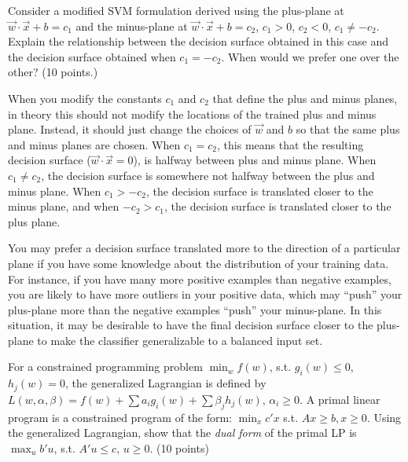 \documentclass[fleqn]{homework}
\begin{document}
  \maketitle

  \begin{problem}{1}
    \begin{question}
      Consider a modified SVM formulation derived using the plus-plane at
      $\vec{w}\cdot\vec{x} + b = c_1$ and the minus-plane at
      $\vec{w}\cdot\vec{x}+b=c_2$, $c_1>0$, $c_2<0$, $c_1 \ne -c_2$.  Explain
      the relationship between the decision surface obtained in this case and
      the decision surface obtained when $c_1 = -c_2$.  When would we prefer one
      over the other? (10 points.)
    \end{question}

    When you modify the constants $c_1$ and $c_2$ that define the plus and minus
    planes, in theory this should not modify the locations of the trained plus
    and minus plane.  Instead, it should just change the choices of $\vec{w}$
    and $b$ so that the same plus and minus planes are chosen.  When
    $c_1 = c_2$, this means that the resulting decision surface
    ($\vec{w}\cdot\vec{x} = 0$), is halfway between plus and minus plane.  When
    $c_1 \ne c_2$, the decision surface is somewhere not halfway between the
    plus and minus plane.  When $c_1 > -c_2$, the decision surface is translated
    closer to the minus plane, and when $-c_2 > c_1$, the decision surface is
    translated closer to the plus plane.

    You may prefer a decision surface translated more to the direction of a
    particular plane if you have some knowledge about the distribution of your
    training data.  For instance, if you have many more positive examples than
    negative examples, you are likely to have more outliers in your positive
    data, which may ``push'' your plus-plane more than the negative examples
    ``push'' your minus-plane.  In this situation, it may be desirable to have
    the final decision surface closer to the plus-plane to make the classifier
    generalizable to a balanced input set.
  \end{problem}

  \begin{problem}{2}
    \begin{question}
      For a constrained programming problem $\min_w f(w)$, s.t. $g_i(w) \le 0$,
      $h_j(w) = 0$, the generalized Lagrangian is defined by
      $L(w, \alpha, \beta) = f(w) + \sum a_i g_i(w) + \sum \beta_j h_j(w)$,
      $\alpha_i \ge 0$.  A primal linear program is a constrained program of the
      form: $\min_x c'x$ s.t. $Ax \ge b, x \ge 0$.  Using the generalized
      Lagrangian, show that the \textit{dual form} of the primal LP is
      $\max_u b' u$, s.t. $A' u \le c$, $u \ge 0$. (10 points)
    \end{question}
  \end{problem}
\end{document}
